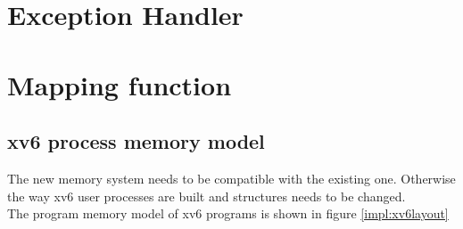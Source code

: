 



\section{Exception Handler}


\section{Mapping function}





\subsection{xv6 process memory model}
The new memory system needs to be compatible with the existing one. Otherwise the way xv6
user processes are built and structures needs to be changed.\\
The program memory model of xv6 programs is shown in figure \ref{impl:xv6layout}


